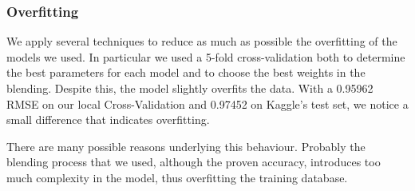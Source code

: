 \documentclass[10pt,conference,compsocconf]{IEEEtran}
\begin{document}
%
%

\subsubsection{Overfitting}
We apply several techniques to reduce as much as possible the overfitting of the models we used. In
particular we used a 5-fold cross-validation both to determine the best parameters for each model and to
choose the best weights in the blending.
Despite this, the model slightly overfits the data. With a 0.95962 RMSE on our local Cross-Validation and 0.97452 on Kaggle's test set, we notice a small difference that indicates overfitting.

There are many possible reasons underlying this behaviour. Probably the blending process that we
used, although the proven accuracy, introduces too much complexity in the model, thus overfitting
the training database.







\end{document}
